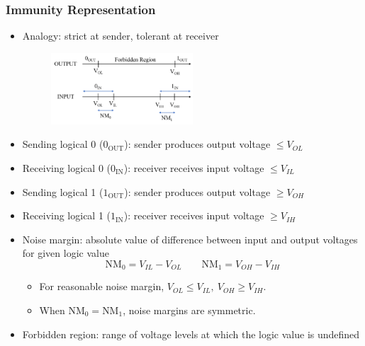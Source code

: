 \documentclass[a4paper]{article}
\begin{document}
\newpage
\subsubsection{Immunity Representation}
\begin{itemize}
    \item Analogy: strict at sender, tolerant at receiver
    \bigskip
    \begin{figure}[H]
    \centering
    \includegraphics[width=0.5\textwidth]{static-discipline.png}
    \end{figure}
    \item Sending logical 0 ($0_\text{OUT}$): sender produces output voltage $\leq V_{OL}$
    \item Receiving logical 0 ($0_\text{IN}$): receiver receives input voltage $\leq V_{IL}$
    \item Sending logical 1 ($1_\text{OUT}$): sender produces output voltage $\geq V_{OH}$
    \item Receiving logical 1 ($1_\text{IN}$): receiver receives input voltage $\geq V_{IH}$
    \bigskip
    \item Noise margin: absolute value of difference between input and output voltages for given logic value
    $$\text{NM}_{0} = V_{IL} - V_{OL}\qquad \text{NM}_{1} = V_{OH}-V_{IH}$$
    \begin{itemize}[label=$\circ$]
        \item For reasonable noise margin, $V_{OL}\leq V_{IL},\ V_{OH}\geq V_{IH}$.
        \item When $\text{NM}_0 = \text{NM}_1$, noise margins are symmetric.
    \end{itemize}
    \bigskip
    \item Forbidden region: range of voltage levels at which the logic value is undefined
\end{itemize}
\end{document}
